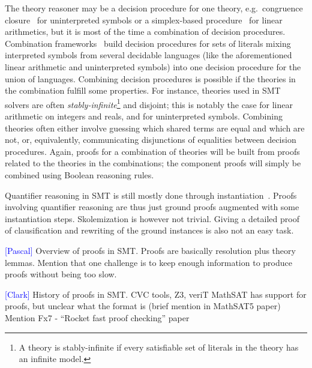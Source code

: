 \documentclass{llncs}
\newcommand{\Note}[1]{\textcolor{blue}{[#1]}}
\begin{document}
The theory reasoner may be a decision procedure for one theory, e.g.\ congruence
closure~\cite{Nelson2,Nieuwenhuis6} for uninterpreted symbols or a simplex-based
procedure~\cite{Dutertre1} for linear arithmetics, but it is most of the time a
combination of decision procedures.  Combination
frameworks~\cite{Nelson3,Tinelli1} build decision procedures for sets of
literals mixing interpreted symbols from several decidable languages (like the
aforementioned linear arithmetic and uninterpreted symbols) into one decision
procedure for the union of languages.  Combining decision procedures is possible
if the theories in the combination fulfill some properties.  For instance,
theories used in SMT solvers are often \emph{stably-infinite}\footnote{A theory
  is stably-infinite if every satisfiable set of literals in the theory has an
  infinite model.} and disjoint; this is notably the case for linear arithmetic
on integers and reals, and for uninterpreted symbols.  Combining theories often
either involve guessing which shared terms are equal and which are not, or,
equivalently, communicating disjunctions of equalities between decision
procedures.  Again, proofs for a combination of theories will be built from
proofs related to the theories in the combinations; the component proofs will
simply be combined using Boolean reasoning rules.

Quantifier reasoning in SMT is still mostly done through
instantiation~\cite{Moura9}.  Proofs involving quantifier reasoning are thus
just ground proofs augmented with some instantiation steps.  Skolemization is
however not trivial.  Giving a detailed proof of clausification and rewriting of
the ground instances is also not an easy task.



\Note{Pascal}
Overview of proofs in SMT.  Proofs are basically resolution plus theory
lemmas.  Mention that one challenge is to keep enough information to produce
proofs without being too slow.

\Note{Clark}
History of proofs in SMT.  CVC tools, Z3, veriT
MathSAT has support for proofs, but unclear what the format is (brief mention
in MathSAT5 paper)
Mention Fx7 - ``Rocket fast proof checking'' paper
\end{document}
